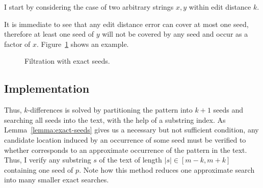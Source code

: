 I start by considering the case of two arbitrary strings $x,y$ within edit distance $k$.
It is immediate to see that any edit distance error can cover at most one seed, therefore at least one seed of $y$ will not be covered by any seed and occur as a factor of $x$.
Figure~\ref{fig:seeds-ext} shows an example.

\begin{figure}[h]
\begin{center}
\caption{Filtration with exact seeds.}
\label{fig:seeds-ext}

\end{center}
\end{figure}

\subsection{Implementation}

Thus, $k$-differences is solved by partitioning the pattern into $k+1$ seeds and searching all seeds into the text, \eg with the help of a substring index.
As Lemma~\ref{lemma:exact-seeds} gives us a necessary but not sufficient condition, any candidate location induced by an occurrence of some seed must be verified to whether corresponds to an approximate occurrence of the pattern in the text.
Thus, I verify any substring $s$ of the text of length $|s| \in [m - k, m + k]$ containing one seed of $p$.
Note how this method reduces one approximate search into many smaller exact searches.


